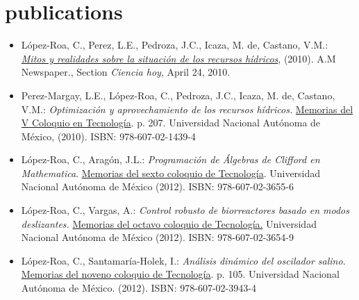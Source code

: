 \documentclass[]{friggeri-cv}
\begin{document}


\section{publications}
\begin{itemize}

\item L\'{o}pez-Roa, C., Perez, L.E., Pedroza, J.C., Icaza, M. de, Castano, V.M.: \href{http://dl.dropbox.com/u/2115508/SRH.pdf}{\emph{Mitos y realidades sobre la situaci\'{o}n de los recursos h\'{i}dricos}}, (2010). A.M Newspaper., Section \emph{Ciencia hoy}, April 24, 2010.

\item Perez-Margay, L.E., L\'{o}pez-Roa, C., Pedroza, J.C., Icaza, M. de, Castano, V.M.: \emph{Optimizaci\'{o}n y aprovechamiento de los recursos h\'{i}dricos.} \href{http://tecnologia.fata.unam.mx/sites/tecnologia.fata.unam.mx/files/coloquio/MC05.pdf}{Memorias del V Coloquio en Tecnolog\'{i}a}. p. 207. Universidad Nacional Aut\'{o}noma de M\'{e}xico, (2010). ISBN: 978-607-02-1439-4

\item L\'{o}pez-Roa, C., Arag\'{o}n, J.L.: \emph{Programaci\'{o}n de \'{A}lgebras de Clifford en Mathematica}. \href{http://dl.dropboxusercontent.com/u/2115508/COT5.pdf}{Memorias del sexto coloquio de Tecnolog\'{i}a}. Universidad Nacional Aut\'{o}noma de M\'{e}xico (2012). ISBN: 978-607-02-3655-6

\item L\'{o}pez-Roa, C., Vargas, A.: \emph{Control robusto de biorreactores basado en modos deslizantes.} \href{https://dl.dropboxusercontent.com/u/2115508/REX6CLR.pdf}{Memorias del octavo coloquio de Tecnolog\'{i}a.} Universidad Nacional Aut\'{o}noma de M\'{e}xico (2012). ISBN: 978-607-02-3654-9

\item L\'{o}pez-Roa, C., Santamar\'{i}a-Holek, I.: \emph{An\'{a}lisis din\'{a}mico del oscilador salino}. \href{https://dl.dropboxusercontent.com/u/2115508/REX7.pdf}{Memorias del noveno coloquio de Tecnolog\'{i}a}. p. 105. Universidad Nacional Aut\'{o}noma de M\'{e}xico. (2012). ISBN: 978-607-02-3943-4

%
\end{itemize} 
\end{document}
